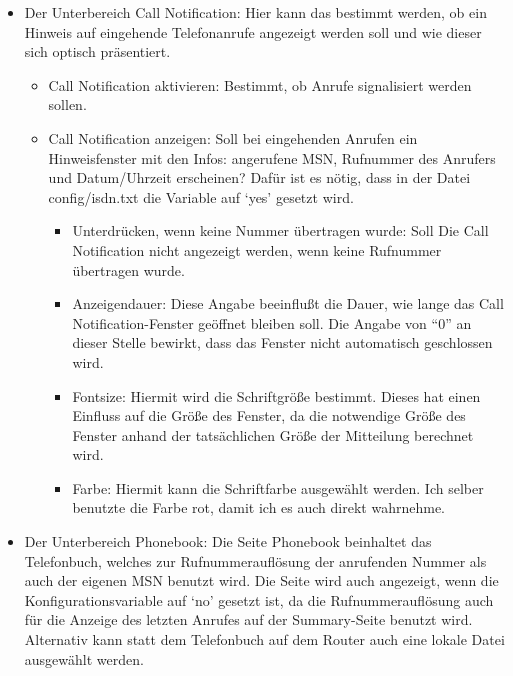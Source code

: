 \begin{itemize}
  \item Der Unterbereich Call Notification: 
    Hier kann das bestimmt werden, ob ein Hinweis auf eingehende Telefonanrufe
    angezeigt werden soll und wie dieser sich optisch präsentiert.
    \begin{itemize}
      \item Call Notification aktivieren: Bestimmt, ob Anrufe signalisiert
        werden sollen.
      \item Call Notification anzeigen: Soll bei eingehenden Anrufen ein
        Hinweisfenster mit den Infos: angerufene MSN, Rufnummer des Anrufers und 
        Datum/Uhrzeit erscheinen? Dafür ist es nötig, dass in der Datei 
        config/isdn.txt die Variable  auf `yes' gesetzt 
        wird.
        \begin{itemize}
          \item Unterdrücken, wenn keine Nummer übertragen wurde: Soll Die 
            Call Notification nicht angezeigt werden, wenn keine Rufnummer 
            übertragen wurde.
          \item Anzeigendauer: Diese Angabe beeinflußt die Dauer, wie lange das 
            Call Noti\-fication-Fenster geöffnet bleiben soll. Die Angabe von 
            ``0'' an dieser Stelle bewirkt, dass das Fenster nicht automatisch 
            geschlossen wird.
          \item Fontsize: Hiermit wird die Schriftgröße bestimmt. Dieses hat 
            einen Einfluss auf die Größe des Fenster, da die notwendige Größe 
            des Fenster anhand der tatsächlichen Größe der Mitteilung berechnet 
            wird.
          \item Farbe: Hiermit kann die Schriftfarbe ausgewählt werden. Ich 
            selber benutzte die Farbe rot, damit ich es auch direkt wahrnehme.
      \end{itemize}
    \end{itemize}
    

  \item Der Unterbereich Phonebook: Die Seite Phonebook beinhaltet das
    Telefonbuch, welches zur Rufnummerauflösung der anrufenden Nummer
    als auch der eigenen MSN benutzt wird. Die Seite wird auch
    angezeigt, wenn die Konfigurationsvariable  auf `no'
    gesetzt ist, da die Rufnummerauflösung auch für die Anzeige des
    letzten Anrufes auf der Summary-Seite benutzt wird. Alternativ
    kann statt dem Telefonbuch auf dem Router auch eine lokale Datei
    ausgewählt werden.


\end{itemize}
